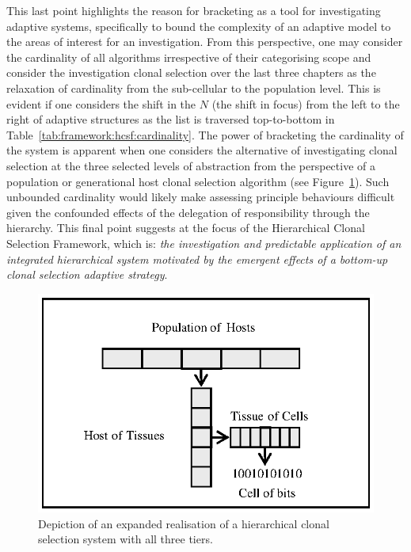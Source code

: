 This last point highlights the reason for bracketing as a tool for investigating adaptive systems, specifically to bound the complexity of an adaptive model to the areas of interest for an investigation. From this perspective, one may consider the cardinality of all algorithms irrespective of their categorising scope and consider the investigation clonal selection over the last three chapters as the relaxation of cardinality from the sub-cellular to the population level. This is evident if one considers the shift in the $N$ (the shift in focus) from the left to the right of adaptive structures as the list is traversed top-to-bottom in Table~\ref{tab:framework:hcsf:cardinality}.
The power of bracketing the cardinality of the system is apparent when one considers the alternative of investigating clonal selection at the three selected levels of abstraction from the perspective of a population or generational host clonal selection algorithm (see Figure~\ref{fig:framework:hcsf:expanded}). Such unbounded cardinality would likely make assessing principle behaviours difficult given the confounded effects of the delegation of responsibility through the hierarchy. 
This final point suggests at the focus of the Hierarchical Clonal Selection Framework, which is: \emph{the investigation and predictable application of an integrated hierarchical system motivated by the emergent effects of a bottom-up clonal selection adaptive strategy}.

\begin{figure}[ht]
	\centering
		\includegraphics[scale=0.85]{Framework/framework-clonalselection-hierarchy-expansion}
	\caption{Depiction of an expanded realisation of a hierarchical clonal selection system with all three tiers.}
	\label{fig:framework:hcsf:expanded}
\end{figure}


